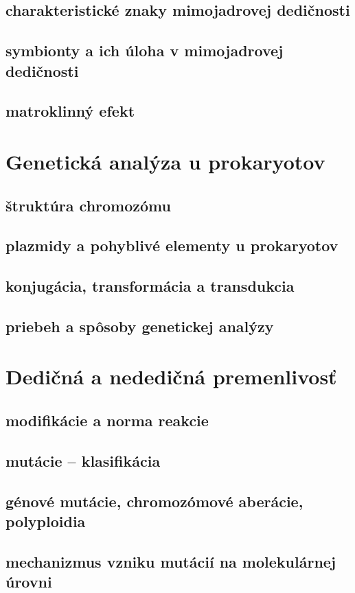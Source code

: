 \subsection{charakteristické znaky mimojadrovej dedičnosti}
\subsection{symbionty a ich úloha v mimojadrovej dedičnosti}
\subsection{matroklinný efekt}

\section{Genetická analýza u prokaryotov}
\subsection{štruktúra chromozómu}
\subsection{plazmidy a pohyblivé elementy u prokaryotov}
\subsection{konjugácia, transformácia a transdukcia}
\subsection{priebeh a spôsoby genetickej analýzy}

\section{Dedičná a nededičná premenlivosť}
\subsection{modifikácie a norma reakcie}
\subsection{mutácie -- klasifikácia}
\subsection{génové mutácie, chromozómové aberácie, polyploidia}
\subsection{mechanizmus vzniku mutácií na molekulárnej úrovni}
